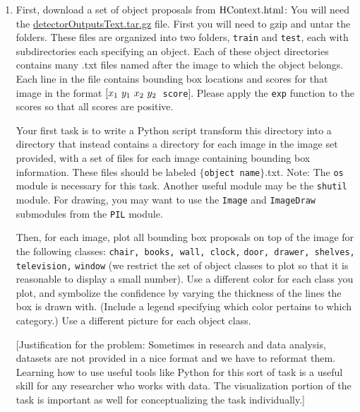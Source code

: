 \documentclass[12pt]{article}
\newcommand{\txt}[1]
{\textnormal{#1}}
\begin{document}
\begin{enumerate}

\item First, download a set of object proposals from \href{http://people.csail.mit.edu/myungjin/HContext.html}{$\txt{HContext.html}$}: You will need the \href{http://groups.csail.mit.edu/vision/Hcontext/data/detectorOutputsText.tar.gz}{detectorOutputsText.tar.gz} file. First you will need to gzip and untar the folders. These files are organized into two folders, \texttt{train} and \texttt{test}, each with subdirectories each specifying an object. Each of these object directories contains many .txt files named after the image to which the object belongs. Each line in the file contains bounding box locations and scores for that image in the format $[x_1 \txt{ } y_1 \txt{ } x_2 \txt{ } y_2 $\texttt{ score}$]$. Please apply the \texttt{exp} function to the scores so that all scores are positive. 

Your first task is to write a Python script transform this directory into a directory that instead contains a directory for each image in the image set provided, with a set of files for each image containing bounding box information. These files should be labeled $\{$\texttt{object name}$\}$.txt. Note: The \texttt{os} module is necessary for this task. Another useful module may be the \texttt{shutil} module. For drawing, you may want to use the \texttt{Image} and \texttt{ImageDraw} submodules from the \texttt{PIL} module.

Then, for each image, plot all bounding box proposals on top of the image for the following classes: \texttt{chair, books, wall, clock,} \texttt{door, drawer, shelves,} 
\texttt{television,} \texttt{window} (we restrict the set of object classes to plot so that it is reasonable to display a small number). Use a different color for each class you plot, and symbolize the confidence by varying the thickness of the lines the box is drawn with. (Include a legend specifying which color pertains to which category.) Use a different picture for each object class. 

[Justification for the problem: Sometimes in research and data analysis, datasets are not provided in a nice format and we have to reformat them. Learning how to use useful tools like Python for this sort of task is a useful skill for any researcher who works with data. The visualization portion of the task is important as well for conceptualizing the task individually.]


\end{enumerate}
\end{document}
